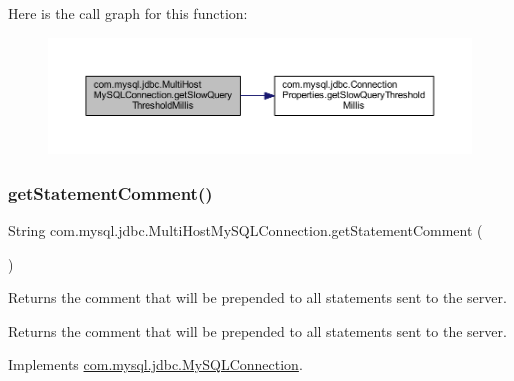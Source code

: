 Here is the call graph for this function\+:
\nopagebreak
\begin{figure}[H]
\begin{center}
\leavevmode
\includegraphics[width=350pt]{classcom_1_1mysql_1_1jdbc_1_1_multi_host_my_s_q_l_connection_a9ca9e74c9171ea4bed5d5218700ea951_cgraph}
\end{center}
\end{figure}
\mbox{\label{classcom_1_1mysql_1_1jdbc_1_1_multi_host_my_s_q_l_connection_a9d4bbb42860206a659b53b3d5441fac3}} 
\subsubsection{\texorpdfstring{get\+Statement\+Comment()}{getStatementComment()}}
{\footnotesize\ttfamily String com.\+mysql.\+jdbc.\+Multi\+Host\+My\+S\+Q\+L\+Connection.\+get\+Statement\+Comment (\begin{DoxyParamCaption}{ }\end{DoxyParamCaption})}

Returns the comment that will be prepended to all statements sent to the server.

\begin{DoxyReturn}{Returns}
the comment that will be prepended to all statements sent to the server. 
\end{DoxyReturn}


Implements \mbox{\hyperlink{interfacecom_1_1mysql_1_1jdbc_1_1_my_s_q_l_connection_aca7bbebb7ec6fa745218e6dca38cfaad}{com.\+mysql.\+jdbc.\+My\+S\+Q\+L\+Connection}}.

